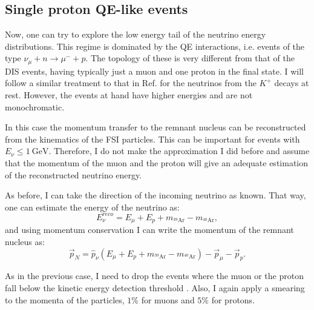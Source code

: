 \subsection{Single proton QE-like events}

Now, one can try to explore the low energy tail of the neutrino energy distributions. This regime is dominated by the QE interactions, i.e. events of the type $\nu_{\mu} + n \rightarrow \mu^{-} + p$. The topology of these is very different from that of the DIS events, having typically just a muon and one proton in the final state. I will follow a similar treatment to that in Ref. \cite{DUNE2021} for the neutrinos from the $K^{+}$ decays at rest. However, the events at hand have higher energies and are not monochromatic.

In this case the momentum transfer to the remnant nucleus can be reconstructed from the kinematics of the FSI particles. This can be important for events with $E_{\nu} \leq 1 ~ \mathrm{GeV}$. Therefore, I do not make the approximation I did before and assume that the momentum of the muon and the proton will give an adequate estimation of the reconstructed neutrino energy.

As before, I can take the direction of the incoming neutrino as known. That way, one can estimate the energy of the neutrino as:
\begin{equation}\label{6.6}
	E_{\nu}^{reco} = E_{\mu} + E_{p} + m_{^{39}\mathrm{Ar}} - m_{^{40}\mathrm{Ar}},
\end{equation}
and using momentum conservation I can write the momentum of the remnant nucleus as:
\begin{equation}\label{6.7}
	\vec{p}_{N} = \hat{p}_{\nu} \left(E_{\mu} + E_{p} + m_{^{39}\mathrm{Ar}} - m_{^{40}\mathrm{Ar}}\right) - \vec{p}_{\mu} - \vec{p}_{p}.
\end{equation}

As in the previous case, I need to drop the events where the muon or the proton fall below the kinetic energy detection threshold \cite{DUNE2020TDR2}. Also, I again apply a smearing to the momenta of the particles, $1\%$ for muons and $5\%$ for protons.

